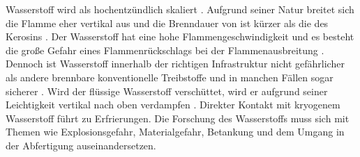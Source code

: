 %
%
%

Wasserstoff wird als hochentzündlich skaliert \cite{dalmia2022powering}. Aufgrund seiner Natur breitet sich die Flamme eher 
vertikal aus und die Brenndauer von  ist kürzer als die des Kerosins \cite{colpan2022fuel}.
Der Wasserstoff hat eine hohe Flammengeschwindigkeit und es besteht die große Gefahr eines Flammenrückschlags bei der Flammenausbreitung \cite{khandelwal2013hydrogen}.
Dennoch ist Wasserstoff innerhalb der richtigen Infrastruktur nicht gefährlicher als andere brennbare konventionelle Treibstoffe und in manchen 
Fällen sogar sicherer \cite{khandelwal2013hydrogen}. 
Wird der flüssige Wasserstoff verschüttet, wird er aufgrund seiner Leichtigkeit vertikal nach oben verdampfen \cite{colpan2022fuel}. 
Direkter Kontakt mit kryogenem Wasserstoff führt zu Erfrierungen.
Die Forschung des Wasserstoffs muss sich mit Themen wie Explosionsgefahr, Materialgefahr, Betankung und 
dem Umgang in der Abfertigung auseinandersetzen. 

